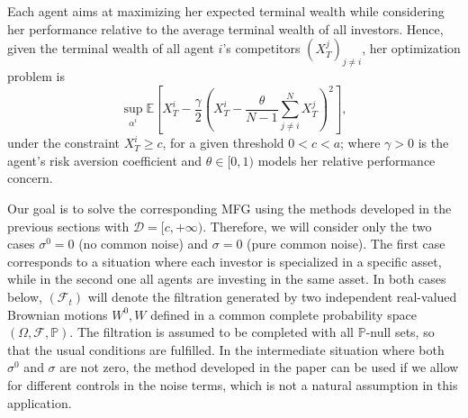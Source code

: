 \documentclass[11pt,a4paper]{article}
\begin{document}
Each agent aims at maximizing her expected terminal wealth while considering her performance relative to the average terminal wealth of all investors. Hence, given the terminal wealth of all agent $i$'s competitors  $(X_T ^j)_{j \neq i}$, her optimization problem is
\[ \sup_{\alpha^i} \mathbb E\left[ X_T^i -\frac{\gamma}{2}\left(X_T^i - \dfrac{\theta}{N-1}\sum_{j\neq i}^N X_T^j \right)^2  \right], \]
under the constraint $X_T^i \geq c$, for a given threshold $0 < c < a$; where $\gamma>0$ is the agent's risk aversion coefficient and $\theta \in [0,1)$ models her relative performance concern.

Our goal is to solve the corresponding MFG using the methods developed in the previous sections with $\mathcal D = [c,+\infty)$. Therefore, we will consider only the two cases $\sigma^0=0$ (no common noise) and $\sigma =0$ (pure common noise). The first case corresponds to a situation where each investor is specialized in a specific asset, while in the second one all agents are investing in the same asset. In both cases below, $(\mathcal F_t)$ will denote the filtration generated by two independent real-valued Brownian motions $W^0,W$ defined in a common complete probability space $(\Omega, \mathcal F, \mathbb P)$. The filtration is assumed to be completed with all $\mathbb P$-null sets, so that the usual conditions are fulfilled. 
 In the intermediate situation where both 
$\sigma^0$ and $\sigma$ are not zero, the method developed in the paper can be used if we allow for different controls in the noise terms, which is not a natural assumption in this application. 
\end{document}
